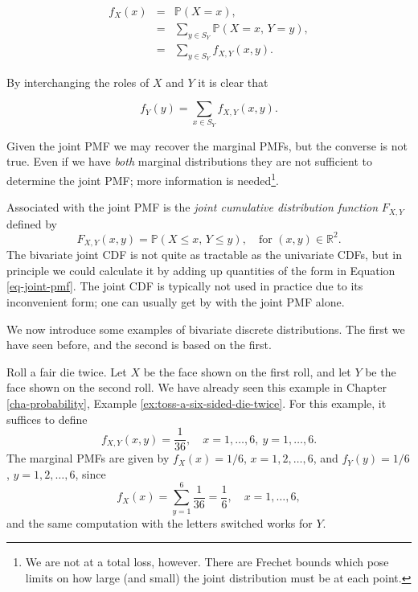 \documentclass[]{book}
\let\rmarkdownfootnote\footnote%
\def\footnote{\protect\rmarkdownfootnote}
\numberwithin{equation}{chapter}
\numberwithin{figure}{chapter}
\theoremstyle{plain}
\theoremstyle{definition}
\theoremstyle{remark}
\theoremstyle{definition}
\theoremstyle{definition}
\theoremstyle{remark}
\let\BeginKnitrBlock\begin \let\EndKnitrBlock\end
\begin{document}
\begin{eqnarray}
f_{X}(x) & = & \mathbb{P}(X=x),\\
 & = & \sum_{y\in S_{Y}}\mathbb{P}(X=x,\, Y=y),\\
 & = & \sum_{y\in S_{Y}}f_{X,Y}(x,y).
\end{eqnarray}

By interchanging the roles of \(X\) and \(Y\) it is clear that

\begin{equation}
\label{eq-marginal-pmf}
f_{Y}(y)=\sum_{x\in S_{Y}}f_{X,Y}(x,y).
\end{equation}

Given the joint PMF we may recover the marginal PMFs, but the converse
is not true. Even if we have \emph{both} marginal distributions they are
not sufficient to determine the joint PMF; more information is
needed\footnote{We are not at a total loss, however. There are Frechet
  bounds which pose limits on how large (and small) the joint
  distribution must be at each point.}.

Associated with the joint PMF is the \emph{joint cumulative distribution
function} \(F_{X,Y}\) defined by \[ F_{X,Y}(x,y)=\mathbb{P}(X\leq x,\,
Y\leq y),\quad \mbox{for }(x,y)\in\mathbb{R}^{2}.  \] The bivariate
joint CDF is not quite as tractable as the univariate CDFs, but in
principle we could calculate it by adding up quantities of the form in
Equation \eqref{eq-joint-pmf}. The joint CDF is typically not used in
practice due to its inconvenient form; one can usually get by with the
joint PMF alone.

We now introduce some examples of bivariate discrete distributions. The
first we have seen before, and the second is based on the first.

\bigskip

\BeginKnitrBlock{example}
\protect\hypertarget{ex:toss-two-dice-joint-pmf}{}{\label{ex:toss-two-dice-joint-pmf}}Roll
a fair die twice. Let \(X\) be the face shown on the first roll, and let
\(Y\) be the face shown on the second roll. We have already seen this
example in Chapter \ref{cha-probability}, Example
\ref{ex:toss-a-six-sided-die-twice}. For this example, it suffices to
define \[ f_{X,Y}(x,y)=\frac{1}{36},\quad
x=1,\ldots,6,\ y=1,\ldots,6.  \] The marginal PMFs are given by
\(f_{X}(x)=1/6\), \(x=1,2,\ldots,6\), and \(f_{Y}(y)=1/6\),
\(y=1,2,\ldots,6\), since \[
f_{X}(x)=\sum_{y=1}^{6}\frac{1}{36}=\frac{1}{6},\quad x=1,\ldots,6, \]
and the same computation with the letters switched works for \(Y\).
\EndKnitrBlock{example}
\end{document}
